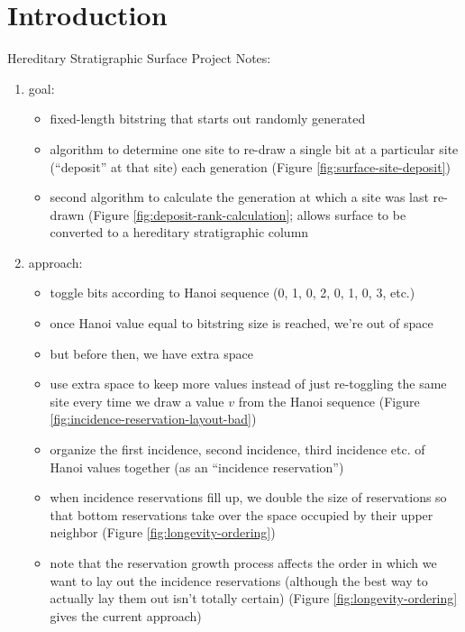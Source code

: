 \section{Introduction} \label{sec:introduction}










Hereditary Stratigraphic Surface Project Notes:

\begin{enumerate}
\item goal:
\begin{itemize}
  \item fixed-length bitstring that starts out randomly generated
  \item algorithm to determine one site to re-draw a single bit at a particular site (``deposit'' at that site) each generation (Figure \ref{fig:surface-site-deposit})
  \item second algorithm to calculate the generation at which a site was last re-drawn (Figure \ref{fig:deposit-rank-calculation}; allows surface to be converted to a hereditary stratigraphic column
\end{itemize}
\item approach:
\begin{itemize}
  \item toggle bits according to Hanoi sequence (0, 1, 0, 2, 0, 1, 0, 3, etc.)
  \item once Hanoi value equal to bitstring size is reached, we're out of space
  \item but before then, we have extra space
  \item use extra space to keep more values instead of just re-toggling the same site every time we draw a value $v$ from the Hanoi sequence (Figure \ref{fig:incidence-reservation-layout-bad})
  \item organize the first incidence, second incidence, third incidence etc. of Hanoi values together (as an ``incidence reservation'')
  \item when incidence reservations fill up, we double the size of reservations so that bottom reservations take over the space occupied by their upper neighbor (Figure \ref{fig:longevity-ordering})
  \item note that the reservation growth process affects the order in which we want to lay out the incidence reservations (although the best way to actually lay them out isn't totally certain) (Figure \ref{fig:longevity-ordering} gives the current approach)

\end{itemize}
\end{enumerate}
